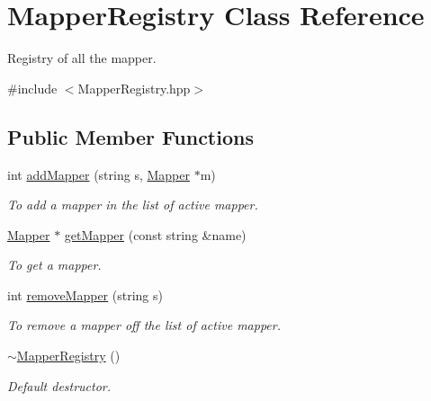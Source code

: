 \hypertarget{classMapperRegistry}{
\section{MapperRegistry Class Reference}
\label{classMapperRegistry}
}


Registry of all the mapper.  




{\ttfamily \#include $<$MapperRegistry.hpp$>$}

\subsection*{Public Member Functions}
\begin{DoxyCompactItemize}
\item 
int \hyperlink{classMapperRegistry_a232e9b4c21a48eb91ea0323c430a33d4}{addMapper} (string s, \hyperlink{classMapper}{Mapper} $\ast$m)
\begin{DoxyCompactList}\small\item\em To add a mapper in the list of active mapper. \item\end{DoxyCompactList}\item 
\hyperlink{classMapper}{Mapper} $\ast$ \hyperlink{classMapperRegistry_aff1042d6b0d087579370b90580c8d159}{getMapper} (const string \&name)
\begin{DoxyCompactList}\small\item\em To get a mapper. \item\end{DoxyCompactList}\item 
int \hyperlink{classMapperRegistry_a9b24e409f7737026cf087339ed48bf25}{removeMapper} (string s)
\begin{DoxyCompactList}\small\item\em To remove a mapper off the list of active mapper. \item\end{DoxyCompactList}\item 
\hypertarget{classMapperRegistry_a2dd8065dd451525dd2ec821cda40407a}{
\hyperlink{classMapperRegistry_a2dd8065dd451525dd2ec821cda40407a}{$\sim$MapperRegistry} ()}
\label{classMapperRegistry_a2dd8065dd451525dd2ec821cda40407a}

\begin{DoxyCompactList}\small\item\em Default destructor. \item\end{DoxyCompactList}\end{DoxyCompactItemize}

